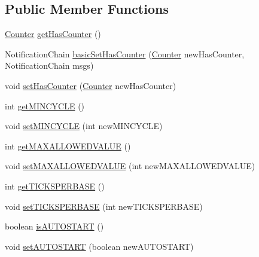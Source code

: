 \subsection*{Public Member Functions}
\begin{DoxyCompactItemize}
\item 
\hyperlink{interfaceshootingmachineemfmodel_1_1_counter}{Counter} \hyperlink{classshootingmachineemfmodel_1_1impl_1_1_alarm_impl_ae1054cff563ee62880b1aef16914bf3d}{get\-Has\-Counter} ()
\item 
Notification\-Chain \hyperlink{classshootingmachineemfmodel_1_1impl_1_1_alarm_impl_a35ff5093aaeb807122967c16a4b5c79a}{basic\-Set\-Has\-Counter} (\hyperlink{interfaceshootingmachineemfmodel_1_1_counter}{Counter} new\-Has\-Counter, Notification\-Chain msgs)
\item 
void \hyperlink{classshootingmachineemfmodel_1_1impl_1_1_alarm_impl_a71ef6671b9417318b0b7636b12feae9b}{set\-Has\-Counter} (\hyperlink{interfaceshootingmachineemfmodel_1_1_counter}{Counter} new\-Has\-Counter)
\item 
int \hyperlink{classshootingmachineemfmodel_1_1impl_1_1_alarm_impl_aac505ee5c09efc58d74135ed3c549009}{get\-M\-I\-N\-C\-Y\-C\-L\-E} ()
\item 
void \hyperlink{classshootingmachineemfmodel_1_1impl_1_1_alarm_impl_a3a661fdc0bb0798b422dd01d9630814f}{set\-M\-I\-N\-C\-Y\-C\-L\-E} (int new\-M\-I\-N\-C\-Y\-C\-L\-E)
\item 
int \hyperlink{classshootingmachineemfmodel_1_1impl_1_1_alarm_impl_a4b4fd8f246341c47e1469cb78ac1fd7b}{get\-M\-A\-X\-A\-L\-L\-O\-W\-E\-D\-V\-A\-L\-U\-E} ()
\item 
void \hyperlink{classshootingmachineemfmodel_1_1impl_1_1_alarm_impl_a86d04829cc9773ffbc15de86adc0da3a}{set\-M\-A\-X\-A\-L\-L\-O\-W\-E\-D\-V\-A\-L\-U\-E} (int new\-M\-A\-X\-A\-L\-L\-O\-W\-E\-D\-V\-A\-L\-U\-E)
\item 
int \hyperlink{classshootingmachineemfmodel_1_1impl_1_1_alarm_impl_aefdf43cc7e5b3ceae03f889f613e7522}{get\-T\-I\-C\-K\-S\-P\-E\-R\-B\-A\-S\-E} ()
\item 
void \hyperlink{classshootingmachineemfmodel_1_1impl_1_1_alarm_impl_aec664170d257fedd50991d76fc22da59}{set\-T\-I\-C\-K\-S\-P\-E\-R\-B\-A\-S\-E} (int new\-T\-I\-C\-K\-S\-P\-E\-R\-B\-A\-S\-E)
\item 
boolean \hyperlink{classshootingmachineemfmodel_1_1impl_1_1_alarm_impl_abf52c0d2ad03e0367f3f315a4683c14f}{is\-A\-U\-T\-O\-S\-T\-A\-R\-T} ()
\item 
void \hyperlink{classshootingmachineemfmodel_1_1impl_1_1_alarm_impl_abd3759645016630203741ee5dbca791d}{set\-A\-U\-T\-O\-S\-T\-A\-R\-T} (boolean new\-A\-U\-T\-O\-S\-T\-A\-R\-T)

\end{DoxyCompactItemize}
